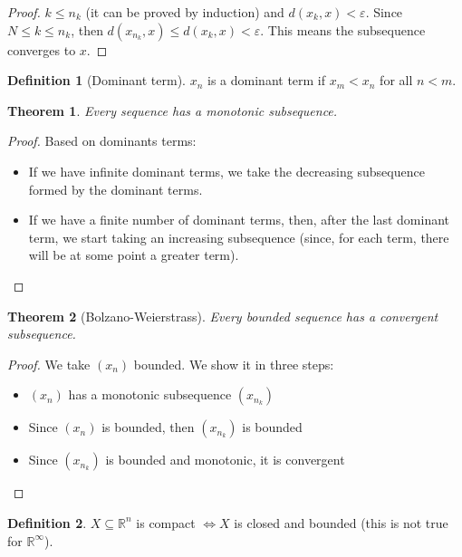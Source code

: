 \documentclass{article}
\theoremstyle{definition}
\newtheorem{definition}{Definition}[section]
\theoremstyle{definition}
\theoremstyle{plain}
\newtheorem{theorem}{Theorem}[section]
\theoremstyle{plain}
\theoremstyle{plain}
\theoremstyle{plain}
\theoremstyle{definition}
\theoremstyle{remark}
\theoremstyle{remark}
\theoremstyle{remark}
\theoremstyle{remark}
\newcommand{\R}{\mathbb{R}}
\newcommand{\E}{\varepsilon}
\begin{document}
\begin{proof}
  $k \leq n_k$ (it can be proved by induction) and $d(x_k,x) < \E$. Since $N \leq k \leq n_k$, then $d(x_{n_k},x) \leq d(x_k,x) < \E$. This means the subsequence converges to $x$.
\end{proof}


\begin{definition}[Dominant term]
  $x_n$ is a dominant term if $x_m < x_n$ for all $n < m$.
\end{definition}


\begin{theorem}
  Every sequence has a monotonic subsequence.
\end{theorem}

\begin{proof}
  Based on dominants terms:
  \begin{itemize}
    \item If we have infinite dominant terms, we take the decreasing subsequence formed by the dominant terms.
    \item If we have a finite number of dominant terms, then, after the last dominant term, we start taking an increasing subsequence (since, for each term, there will be at some point a greater term).
  \end{itemize}
\end{proof}


\begin{theorem}[Bolzano-Weierstrass]
  Every bounded sequence has a convergent subsequence.
\end{theorem}

\begin{proof}
  We take $(x_n)$ bounded. We show it in three steps:
  \begin{itemize}
    \item $(x_n)$ has a monotonic subsequence $(x_{n_k})$
    \item Since $(x_n)$ is bounded, then $(x_{n_k})$ is bounded
    \item Since $(x_{n_k})$ is bounded and monotonic, it is convergent
  \end{itemize}
\end{proof}


\begin{definition}
  $X \subseteq \R^n$ is compact $\iff X$ is closed and bounded (this is not true for $\R^\infty$).
\end{definition}
\end{document}
